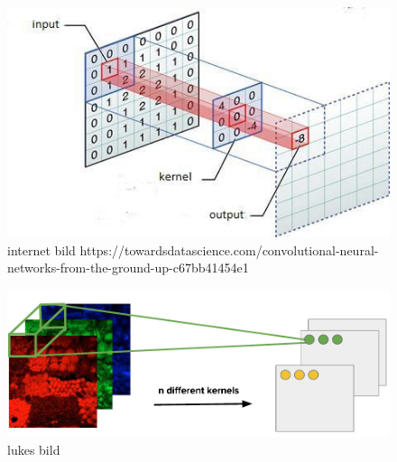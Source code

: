 \documentclass[12pt,letterpaper]{article}
\begin{document}
\begin{figure}[htb]
	\centering
	\includegraphics[width=.6\textwidth]{cnn.png}
	\caption{internet bild https://towardsdatascience.com/convolutional-neural-networks-from-the-ground-up-c67bb41454e1}
	\label{fig1}
\end{figure}

\begin{figure}[htb]
	\centering
	\includegraphics[width=.7\textwidth]{cnn_luke.png}
	\caption{lukes bild}
	\label{fig1}
\end{figure}


\end{document}
